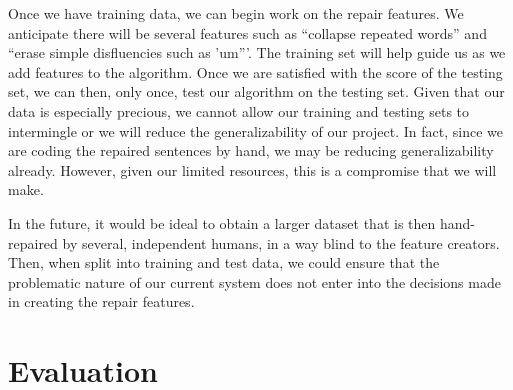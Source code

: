 \documentclass{article}
\begin{document}
\begin{flushleft}

  Once we have training data, we can begin work on the repair features. We anticipate there will be several features such as ``collapse repeated words'' and ``erase simple disfluencies such as 'um'''. The training set will help guide us as we add features to the algorithm. Once we are satisfied with the score of the testing set, we can then, only once, test our algorithm on the testing set. Given that our data is especially precious, we cannot allow our training and testing sets to intermingle or we will reduce the generalizability of our project. In fact, since we are coding the repaired sentences by hand, we may be reducing generalizability already. However, given our limited resources, this is a compromise that we will make.

\end{flushleft}

\begin{flushleft}

  In the future, it would be ideal to obtain a larger dataset that is then hand-repaired by several, independent humans, in a way blind to the feature creators. Then, when split into training and test data, we could ensure that the problematic nature of our current system does not enter into the decisions made in creating the repair features.

\end{flushleft}
    
\section{Evaluation}
\end{document}
